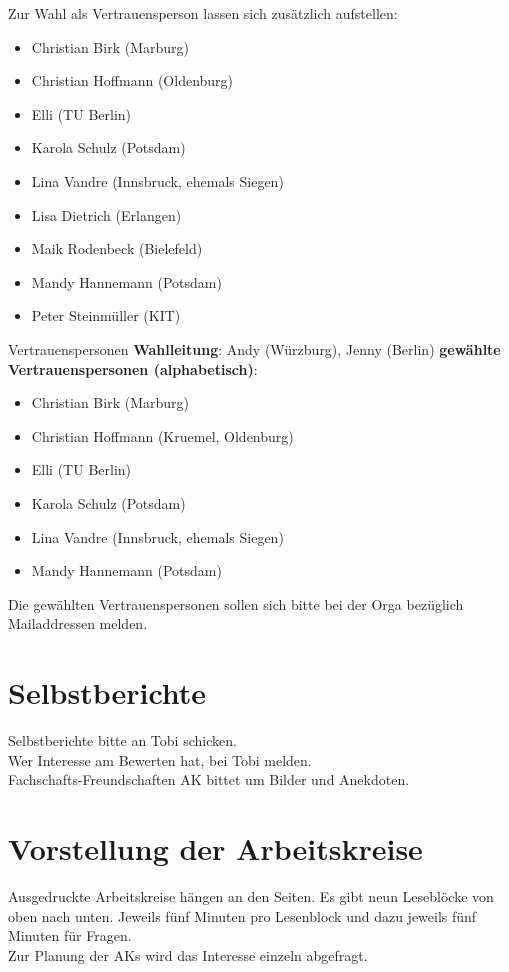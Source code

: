   Zur Wahl als Vertrauensperson lassen sich zusätzlich aufstellen:
  \begin{itemize}
    \item Christian Birk (Marburg)
    \item Christian Hoffmann (Oldenburg)
    \item Elli (TU Berlin)
    \item Karola Schulz (Potsdam)
    \item Lina Vandre (Innsbruck, ehemals Siegen)
    \item Lisa Dietrich (Erlangen)
    \item Maik Rodenbeck (Bielefeld)
    \item Mandy Hannemann (Potsdam)
    \item Peter Steinmüller (KIT)
  \end{itemize}

  \begin{info}{Vertrauenspersonen}
    \textbf{Wahlleitung}: Andy (Würzburg), Jenny (Berlin)
    \tcblower
    \textbf{gewählte Vertrauenspersonen (alphabetisch)}:
    \begin{itemize}
      \item Christian Birk (Marburg)
      \item Christian Hoffmann (Kruemel, Oldenburg)
      \item Elli (TU Berlin)
      \item Karola Schulz (Potsdam)
      \item Lina Vandre (Innsbruck, ehemals Siegen)
      \item Mandy Hannemann (Potsdam)
    \end{itemize}
  \end{info}
  Die gewählten Vertrauenspersonen sollen sich bitte bei der Orga bezüglich Mailaddressen melden.

\section{Selbstberichte}
  Selbstberichte bitte an Tobi schicken. \\
  Wer Interesse am Bewerten hat, bei Tobi melden. \\
  Fachschafts-Freundschaften AK bittet um Bilder und Anekdoten.

\section{Vorstellung der Arbeitskreise}
  Ausgedruckte Arbeitskreise hängen an den Seiten. Es gibt neun Leseblöcke von oben nach unten. Jeweils fünf Minuten pro Lesenblock und dazu jeweils fünf Minuten für Fragen. \\
  Zur Planung der AKs wird das Interesse einzeln abgefragt.

